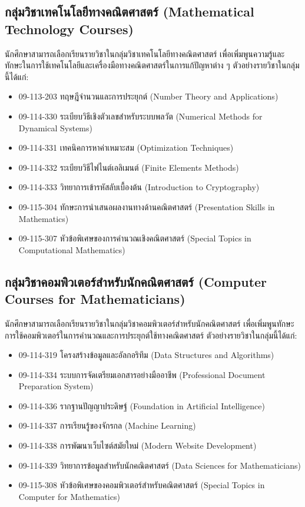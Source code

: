\subsection*{กลุ่มวิชาเทคโนโลยีทางคณิตศาสตร์ (Mathematical Technology Courses)}

นักศึกษาสามารถเลือกเรียนรายวิชาในกลุ่มวิชาเทคโนโลยีทางคณิตศาสตร์ เพื่อเพิ่มพูนความรู้และทักษะในการใช้เทคโนโลยีและเครื่องมือทางคณิตศาสตร์ในการแก้ปัญหาต่าง ๆ ตัวอย่างรายวิชาในกลุ่มนี้ได้แก่:
\begin{itemize}
    \item 09-113-203 ทฤษฎีจำนวนและการประยุกต์ (Number Theory and Applications)
    \item 09-114-330 ระเบียบวิธีเชิงตัวเลขสำหรับระบบพลวัต (Numerical Methods for Dynamical Systems)
    \item 09-114-331 เทคนิคการหาค่าเหมาะสม (Optimization Techniques)
    \item 09-114-332 ระเบียบวิธีไฟไนต์เอลิเมนต์ (Finite Elements Methods)
    \item 09-114-333 วิทยาการเข้ารหัสลับเบื้องต้น (Introduction to Cryptography)
    \item 09-115-304 ทักษะการนำเสนอผลงานทางด้านคณิตศาสตร์ (Presentation Skills in Mathematics)
    \item 09-115-307 หัวข้อพิเศษของการคำนวณเชิงคณิตศาสตร์ (Special Topics in Computational Mathematics)
\end{itemize}

\subsection*{กลุ่มวิชาคอมพิวเตอร์สำหรับนักคณิตศาสตร์ (Computer Courses for Mathematicians)}

นักศึกษาสามารถเลือกเรียนรายวิชาในกลุ่มวิชาคอมพิวเตอร์สำหรับนักคณิตศาสตร์ เพื่อเพิ่มพูนทักษะการใช้คอมพิวเตอร์ในการคำนวณและการประยุกต์ใช้ทางคณิตศาสตร์ ตัวอย่างรายวิชาในกลุ่มนี้ได้แก่:
\begin{itemize}
    \item 09-114-319 โครงสร้างข้อมูลและอัลกอริทึม (Data Structures and Algorithms)
    \item 09-114-334 ระบบการจัดเตรียมเอกสารอย่างมืออาชีพ (Professional Document Preparation System)
    \item 09-114-336 รากฐานปัญญาประดิษฐ์ (Foundation in Artificial Intelligence)
    \item 09-114-337 การเรียนรู้ของจักรกล (Machine Learning)
    \item 09-114-338 การพัฒนาเว็บไซต์สมัยใหม่ (Modern Website Development)
    \item 09-114-339 วิทยาการข้อมูลสำหรับนักคณิตศาสตร์ (Data Sciences for Mathematicians)
    \item 09-115-308 หัวข้อพิเศษของคอมพิวเตอร์สำหรับคณิตศาสตร์ (Special Topics in Computer for Mathematics)
\end{itemize}

